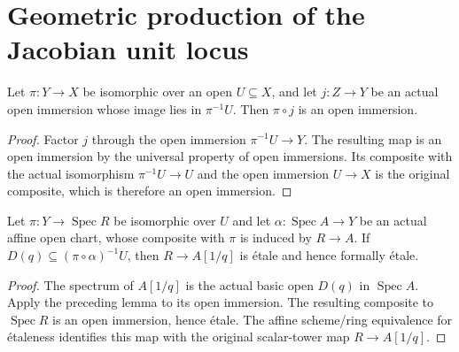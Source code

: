 \section{Geometric production of the Jacobian unit locus}

\begin{lemma}\label{lem:sc0-open-chart-inside-iso}
\leanok
Let $\pi:Y\to X$ be isomorphic over an open $U\subseteq X$, and let $j:Z\to Y$
be an actual open immersion whose image lies in $\pi^{-1}U$. Then $\pi\circ j$
is an open immersion.
\end{lemma}
\begin{proof}
Factor $j$ through the open immersion $\pi^{-1}U\to Y$. The resulting map is an
open immersion by the universal property of open immersions. Its composite with
the actual isomorphism $\pi^{-1}U\to U$ and the open immersion $U\to X$ is the
original composite, which is therefore an open immersion.
\end{proof}

\begin{lemma}\label{lem:sc0-affine-iso-localization-etale}
\leanok
{}
Let $\pi:Y\to\operatorname{Spec}R$ be isomorphic over $U$ and let
$\alpha:\operatorname{Spec}A\to Y$ be an actual affine open chart, whose composite
with $\pi$ is induced by $R\to A$. If $D(q)\subseteq(\pi\circ\alpha)^{-1}U$, then
$R\to A[1/q]$ is \'etale and hence formally \'etale.
\end{lemma}
\begin{proof}
The spectrum of $A[1/q]$ is the actual basic open $D(q)$ in $\operatorname{Spec}A$.
Apply the preceding lemma to its open immersion. The resulting composite to
$\operatorname{Spec}R$ is an open immersion, hence \'etale. The affine scheme/ring
equivalence for \'etaleness identifies this map with the original scalar-tower
map $R\to A[1/q]$.
\end{proof}

